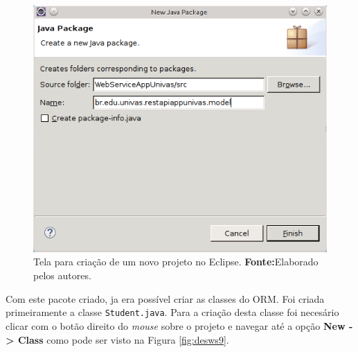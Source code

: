 	\begin{figure}[h!]
		\centerline{\includegraphics[scale=0.8]{./imagens/2_q_metodologico/4_procedimentos_resultados/43_webservice/432_desenvolvimento/desws8.png}}
		\caption[Tela para criação de um novo projeto no Eclipse]{Tela para criação de um novo projeto no Eclipse.
			\textbf{Fonte:}Elaborado pelos autores.}
		\label{fig:desws8}
	\end{figure}
	
	\pagebreak
		
	\par Com este pacote criado, ja era possível criar as classes do ORM. Foi
criada primeiramente a classe \texttt{Student.java}. Para a criação desta classe
foi necesário clicar com o botão direito do \textit{mouse} sobre o projeto e
navegar até a opção \textbf{New -> Class} como pode ser visto na Figura
\ref{fig:desws9}. 

